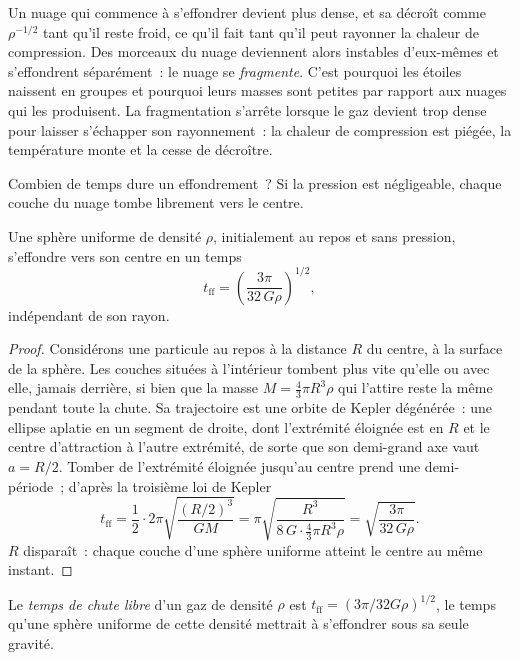 Un nuage qui commence à s'effondrer devient plus dense, et sa  décroît
comme $\rho^{-1/2}$ tant qu'il reste froid, ce qu'il fait tant qu'il peut rayonner la chaleur de compression. Des morceaux du nuage deviennent alors instables d'eux-mêmes et
s'effondrent séparément~: le nuage se \emph{fragmente}. C'est pourquoi les étoiles naissent en groupes et pourquoi leurs masses sont petites par rapport aux nuages qui les produisent. La fragmentation s'arrête lorsque le gaz devient trop dense pour laisser s'échapper
son rayonnement~: la chaleur de compression est piégée, la température monte et la 
cesse
de
décroître.

Combien de temps dure un effondrement~? Si la pression est négligeable, chaque couche
du nuage tombe librement vers le centre.

\begin{proposition}\label{prop:b2:ism-star-formation:free-fall}
Une sphère uniforme de densité $\rho$, initialement au repos et sans pression,
s'effondre vers son centre en un temps
\[
  t_{\mathrm{ff}} = \left(\frac{3\pi}{32\,G\rho}\right)^{1/2},
\]
indépendant de son rayon.
\end{proposition}

\begin{proof}
Considérons une particule au repos à la distance $R$ du centre, à la surface de la sphère.
Les couches situées à l'intérieur tombent plus vite qu'elle ou avec elle, jamais derrière, si bien que la masse $M = \tfrac43\pi R^3\rho$ qui l'attire reste la même pendant toute
la chute. Sa trajectoire est une orbite de Kepler dégénérée~: une ellipse aplatie en un segment de droite, dont l'extrémité éloignée est en $R$ et le centre d'attraction à l'autre extrémité, de sorte que son demi-grand axe vaut $a = R/2$. Tomber de l'extrémité éloignée
jusqu'au centre prend une demi-période~; d'après la troisième
loi
de
Kepler
\[
  t_{\mathrm{ff}} = \frac12\cdot 2\pi\sqrt{\frac{(R/2)^3}{GM}}
  = \pi\sqrt{\frac{R^3}{8\,G\cdot\frac43\pi R^3\rho}}
  = \sqrt{\frac{3\pi}{32\,G\rho}} .
\]
$R$ disparaît~: chaque couche d'une sphère uniforme atteint le centre au même
instant.
\end{proof}

\begin{definition}\label{def:b2:ism-star-formation:free-fall}
Le \emph{temps de chute libre} d'un gaz de densité $\rho$
est $t_{\mathrm{ff}} = (3\pi/32G\rho)^{1/2}$, le temps qu'une sphère uniforme de cette densité mettrait à s'effondrer sous sa seule
gravité.
\end{definition}

